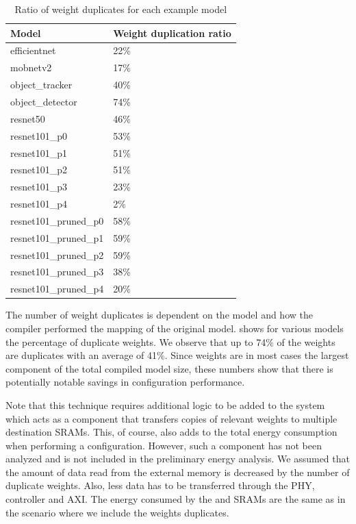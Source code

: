 \begin{table}[hbtp]
\centering
\begin{tabular}{@{}ll@{}}
\toprule
\textbf{Model}          & \textbf{Weight duplication ratio} \\ \midrule
efficientnet            & 22\%                              \\
mobnetv2                & 17\%                              \\
object\_tracker         & 40\%                              \\
object\_detector        & 74\%                              \\
resnet50                & 46\%                              \\
resnet101\_p0           & 53\%                              \\
resnet101\_p1           & 51\%                              \\
resnet101\_p2           & 51\%                              \\
resnet101\_p3           & 23\%                              \\
resnet101\_p4           & 2\%                               \\
resnet101\_pruned\_p0   & 58\%                              \\
resnet101\_pruned\_p1   & 59\%                              \\
resnet101\_pruned\_p2   & 59\%                              \\
resnet101\_pruned\_p3   & 38\%                              \\
resnet101\_pruned\_p4   & 20\%                              \\ \bottomrule
\end{tabular}
\caption{Ratio of weight duplicates for each example model}
\label{tab:example_models_duplicate_weights}
\end{table}

The number of weight duplicates is dependent on the model and how the compiler performed the mapping of the original model.
 shows for various models the percentage of duplicate weights.
We observe that up to 74\% of the weights are duplicates with an average of 41\%.
Since weights are in most cases the largest component of the total compiled model size, these numbers show that there is potentially notable savings in configuration performance.

Note that this technique requires additional logic to be added to the system which acts as a component that transfers copies of relevant weights to multiple destination SRAMs.
This, of course, also adds to the total energy consumption when performing a configuration.
However, such a component has not been analyzed and is not included in the preliminary energy analysis. 
We assumed that the amount of data read from the external memory is decreased by the number of duplicate weights.
Also, less data has to be transferred through the PHY, controller and AXI.
The energy consumed by the \confignoc{} and SRAMs are the same as in the scenario where we include the weights duplicates.

